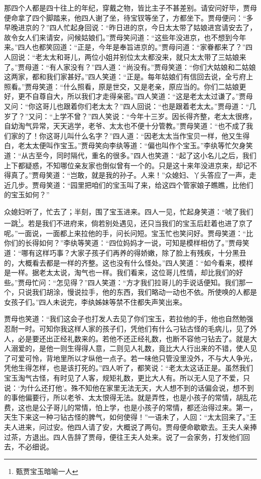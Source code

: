 \documentclass[12pt,oneside]{book}
\begin{document}
那四个人都是四十往上的年纪，穿戴之物，皆比主子不甚差别。请安问好毕，贾母便命拿了四个脚踏来，他四人谢了坐，待宝钗等坐了，方都坐下。贾母便问：“多早晚进京的？”四人忙起身回说：“昨日进的京，今日太太带了姑娘进宫请安去了，故令女人们来请安，问候姑娘们。”贾母笑问道：“这些年没进京，也不想到今年来。”四人也都笑回道：“正是，今年是奉旨进京的。”贾母问道：“家眷都来了？”四人回说：“老太太和哥儿，两位小姐并别位太太都没来，就只太太带了三姑娘来了。”贾母道：“有人家没有？”四人道：“尚没有。”贾母笑道：“你们大姑娘和二姑娘这两家，都和我们家甚好。”四人笑道：“正是。每年姑娘们有信回去说，全亏府上照看。”贾母笑道：“什么照看，原是世交，又是老亲，原应当的。你们二姑娘更好，更不自尊自大，所以我们才走得亲密。”四人笑道：“这是老太太过谦了。”贾母又问：“你这哥儿也跟着你们老太太？”四人回说：“也是跟着老太太。”贾母道：“几岁了？”又问：“上学不曾？”四人笑说：“今年十三岁。因长得齐整，老太太很疼，自幼淘气异常，天天逃学，老爷、太太也不便十分管教。”贾母笑道：“也不成了我们家的了！你这哥儿叫什么名字？”四人道：“因老太太当作宝贝一样，他又生得白，老太太便叫作宝玉。”贾母笑向李纨等道：“偏也叫作个宝玉。”李纨等忙欠身笑道：“从古至今，同时隔代，重名的很多。”四人也笑道：“起了这小名儿之后，我们上下都疑惑，不知哪位亲友家也倒似曾有一个的。只是这十来年没进京来，却记不得真了。”贾母笑道：“岂敢，就是我的孙子。人来！”众媳妇、丫头答应了一声，走近几步。贾母笑道：“园里把咱们的宝玉叫了来，给这四个管家娘子瞧瞧，比他们的宝玉如何？”

众媳妇听了，忙去了；半刻，围了宝玉进来。四人一见，忙起身笑道：“唬了我们一跳\footnote{甄贾宝玉暗喻一人}。若是我们不进府来，倘若别处遇见，还只当我们的宝玉后赶着也进了京了呢。”一面说，一面都上来拉他的手，问长问短。宝玉忙也笑问好。贾母笑道：“比你们的长得如何？”李纨等笑道：“四位妈妈才一说，可知是模样相仿了。”贾母笑道：“哪有这样巧事？大家子孩子们再养的得娇嫩，除了脸上有残疾，十分黑丑的，大概看去都是一样的齐整。这也没有什么怪处。”四人笑道：“如今看来，模样是一样。据老太太说，淘气也一样。我们看来，这位哥儿性情，却比我们的好些。”贾母忙问：“怎见得？”四人笑道：“方才我们拉哥儿的手说话便知。我们那一个，只说我们胡涂，慢说拉手，他的东西，我们略动一动也不依。所使唤的人都是女孩子们。”四人未说完，李纨姊妹等禁不住都失声笑出来。

贾母也笑道：“我们这会子也打发人去见了你们宝玉，若拉他的手，他也自然勉强忍耐一时。可知你我这样人家的孩子们，凭他们有什么刁钻古怪的毛病儿，见了外人，必是要还出正经礼数来的。若他不还正经礼数，也断不容他刁钻去了。就是大人溺爱的，是他一则生得得人意，二则见人礼数，竟比大人行出来的不错，使人见了可爱可怜，背地里所以才纵他一点子。若一味他只管没里没外，不与大人争光，凭他生得怎样，也是该打死的。”四人听了，都笑说：“老太太这话正是。虽然我们宝玉淘气古怪，有时见了人客，规矩礼数，更比大人有。所以无人见了不爱，只说：‘为什么还打他’。殊不知他在家里无法无天，大人想不到的话偏会说，想不到的事他偏要行，所以老爷、太太恨得无法。就是弄性，也是小孩子的常情，胡乱花费，这也是公子哥儿的常情，怕上学，也是小孩子的常情，都还治得过来。第一，天生下来这一种刁钻古怪的脾气，如何使得！”一语未了，人回：“太太回来了。”王夫人进来，问过安。他四人请了安，大概说了两句。贾母便命歇歇去。王夫人亲捧过茶，方退出。四人告辞了贾母，便往王夫人处来。说了一会家务，打发他们回去，不必细说。
\end{document}

